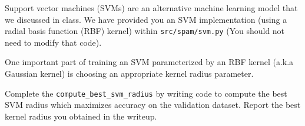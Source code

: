 \item {}
Support vector machines (SVMs) are an alternative machine learning model that we discussed in class.
We have provided you an SVM implementation (using a radial basis function (RBF) kernel) within \texttt{src/spam/svm.py} (You should not need to modify that code).

One important part of training an SVM parameterized by an RBF kernel (a.k.a Gaussian kernel) is choosing an appropriate kernel radius parameter.

Complete the \texttt{compute\_best\_svm\_radius} by writing code to compute the best SVM radius which maximizes accuracy on the validation dataset. Report the best kernel radius you obtained in the writeup.

